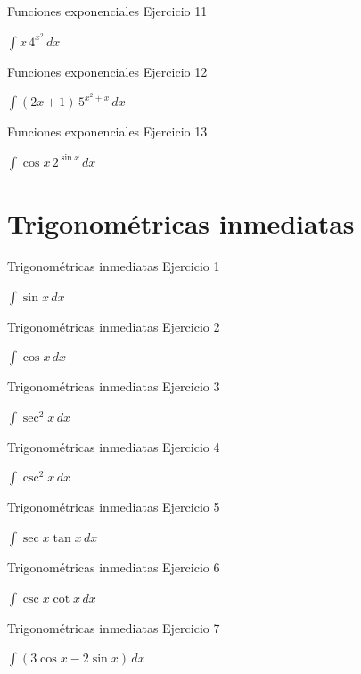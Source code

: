 \documentclass[10pt,aspectratio=169]{beamer}
\newcommand{\ejercicio}[1]{%
  \begin{center}
  \vfill
  {\fontsize{24}{30}\selectfont #1}
  \vfill
  \end{center}
}
\begin{document}
\begin{frame}{Funciones exponenciales}
\small Ejercicio 11
\ejercicio{$\displaystyle \int x\,4^{x^2}\,dx$}
\end{frame}

\begin{frame}{Funciones exponenciales}
\small Ejercicio 12
\ejercicio{$\displaystyle \int (2x+1)\,5^{x^2+x}\,dx$}
\end{frame}

\begin{frame}{Funciones exponenciales}
\small Ejercicio 13
\ejercicio{$\displaystyle \int \cos x\,2^{\sin x}\,dx$}
\end{frame}

\section{Trigonométricas inmediatas}
\begin{frame}{Trigonométricas inmediatas}
\small Ejercicio 1
\ejercicio{$\displaystyle \int\sin x\,dx$}
\end{frame}

\begin{frame}{Trigonométricas inmediatas}
\small Ejercicio 2
\ejercicio{$\displaystyle \int\cos x\,dx$}
\end{frame}

\begin{frame}{Trigonométricas inmediatas}
\small Ejercicio 3
\ejercicio{$\displaystyle \int\sec^2x\,dx$}
\end{frame}

\begin{frame}{Trigonométricas inmediatas}
\small Ejercicio 4
\ejercicio{$\displaystyle \int\csc^2x\,dx$}
\end{frame}

\begin{frame}{Trigonométricas inmediatas}
\small Ejercicio 5
\ejercicio{$\displaystyle \int\sec x\tan x\,dx$}
\end{frame}

\begin{frame}{Trigonométricas inmediatas}
\small Ejercicio 6
\ejercicio{$\displaystyle \int\csc x\cot x\,dx$}
\end{frame}

\begin{frame}{Trigonométricas inmediatas}
\small Ejercicio 7
\ejercicio{$\displaystyle \int(3\cos x-2\sin x)\,dx$}
\end{frame}
\end{document}

